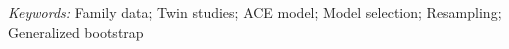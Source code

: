 \documentclass[11pt, letterpaper]{article}
\theoremstyle{definition}
\begin{document}

\noindent%
{\it Keywords:}  
Family data; Twin studies; ACE model; Model selection; Resampling; Generalized bootstrap
\vfill











%
%



\end{document}
